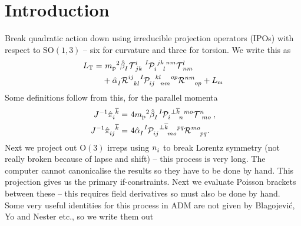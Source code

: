 \documentclass[aps,prd,reprint,preprintnumbers,superscriptaddress,showpacs,floatfix]{revtex4-2}
\begin{document}
\section{Introduction}
Break quadratic action down using irreducible projection operators (IPOs) with respect to $\mathrm{SO}(1,3)$ -- six for curvature and three for torsion. We write this as
\begin{equation}
\begin{aligned}
  L_{\text{T}}=&\ {m_\text{p}}^2\tensor{\hat{\beta}}{_I}\tensor{\mathcal{  T}}{^{i}_{jk}}\tensor[^I]{\mathcal{  P}}{_{i}^{jk}_{l}^{nm}}\tensor{\mathcal{  T}}{^{l}_{nm}}\\
  &+\tensor{\hat{\alpha}}{_I}\tensor{\mathcal{  R}}{^{ij}_{kl}}\tensor[^I]{\mathcal{  P}}{_{ij}^{kl}_{nm}^{op}}\tensor{\mathcal{  R}}{^{nm}_{op}}+L_{\text{m}}
  \label{<+label+>}
\end{aligned}
\end{equation}
Some definitions follow from this, for the parallel momenta
\begin{subequations}
  \begin{align}
    J^{-1}\tensor{\hat{\pi}}{_{i}^{\overline{k}}}=&\ 4{m_\text{p}}^2\tensor{\hat{\beta}}{_{I}}\tensor[^I]{\mathcal{  P}}{_i^{\perp\overline{k}}_n^{mo}}\tensor{\mathcal{  T}}{^n_{mo}},\\
    J^{-1}\tensor{\hat{\pi}}{_{ij}^{\overline{k}}}=&\ 4\tensor{\hat{\alpha}}{_{I}}\tensor[^I]{\mathcal{  P}}{_{ij}^{\perp\overline{k}}_{mo}^{pq}}\tensor{\mathcal{  R}}{^{mo}_{pq}}.
    \label{<+label+>}
  \end{align}
  \label{<+label+>}
\end{subequations}
Next we project out $\mathrm{O}(3)$ irreps using $\tensor{n}{_i}$ to break Lorentz symmetry (not really broken because of lapse and shift) -- this process is very long. The computer cannot canonicalise the results so they have to be done by hand. This projection gives us the primary if-constraints. Next we evaluate Poisson brackets between these -- this requires field derivatives so must also be done by hand. Some very useful identities for this process in ADM are not given by Blagojevi\'c, Yo and Nester etc., so we write them out
\end{document}
